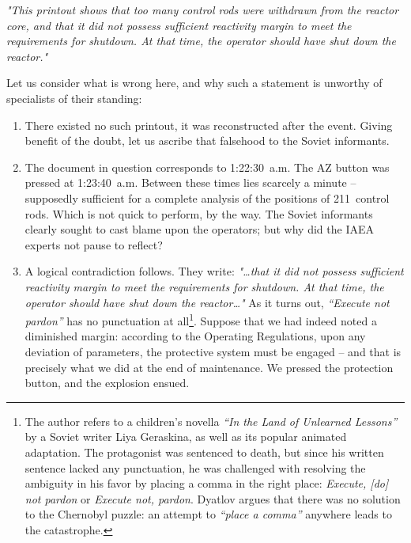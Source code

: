 \documentclass[openright]{bookest}
\begin{document}
\begin{personal}
\textit{"This printout shows that too many control rods were withdrawn from the reactor core, and that it did not possess sufficient reactivity margin to meet the requirements for shutdown. At that time, the operator should have shut down the reactor."}
\end{personal}

Let us consider what is wrong here, and why such a statement is unworthy of specialists of their standing:

\begin{enumerate}
\item There existed no such printout, it was reconstructed after the event. Giving benefit of the doubt, let us ascribe that falsehood to the Soviet informants.

\item The document in question corresponds to 1:22:30~a.m. The AZ button was pressed at 1:23:40~a.m. Between these times lies scarcely a minute -- supposedly sufficient for a complete analysis of the positions of \num{211}~control rods. Which is not quick to perform, by the way. The Soviet informants clearly sought to cast blame upon the operators; but why did the IAEA experts not pause to reflect?

\item A logical contradiction follows. They write: \textit{"\ldots that it did not possess sufficient reactivity margin to meet the requirements for shutdown. At that time, the operator should have shut down the reactor\ldots"} As it turns out, \textit{``Execute not pardon''} has no punctuation at all\footnote{The author refers to a children's novella \textit{``In the Land of Unlearned Lessons''} by a Soviet writer Liya Geraskina, as well as its popular animated adaptation. The protagonist was sentenced to death, but since his written sentence lacked any punctuation, he was challenged with resolving the ambiguity in his favor by placing a comma in the right place: \textit{Execute, [do] not pardon} or \textit{Execute not, pardon}. Dyatlov argues that there was no solution to the Chernobyl puzzle: an attempt to \textit{``place a comma''} anywhere leads to the catastrophe.}. Suppose that we had indeed noted a diminished margin: according to the Operating Regulations, upon any deviation of parameters, the protective system must be engaged -- and that is precisely what we did at the end of maintenance. We pressed the protection button, and the explosion ensued.


\end{enumerate}
\end{document}
